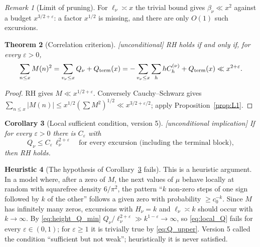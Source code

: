 \documentclass[11pt]{amsart}
\numberwithin{equation}{section}
\theoremstyle{plain}
\newtheorem{theorem}{Theorem}[section]
\newtheorem{corollary}[theorem]{Corollary}
\theoremstyle{definition}
\newtheorem{heuristic}[theorem]{Heuristic}
\theoremstyle{remark}
\newtheorem{remark}[theorem]{Remark}
\newcommand{\eps}{\varepsilon}
\begin{document}
\begin{remark}[Limit of pruning]
\label{rem:pruning_limit}
For $\ell_\nu\asymp x$ the trivial bound gives $\beta_\nu\ll x^2$ against a
budget $x^{3/2+\eps}$: a factor $x^{1/2}$ is missing, and there are only
$O(1)$ such excursions.
\end{remark}

\begin{theorem}[Correlation criterion]
\label{thm:corr-criterion}
\emph{[unconditional]} RH holds if and only if, for every $\eps>0$,
\begin{equation}
\label{eq:RH-corr}
  \sum_{n\le x}M(n)^2=\sum_{v_\nu\le x}Q_\nu+Q_{\rm term}(x)
  =-\sum_{v_\nu\le x}\sum_{h}hC^{(\nu)}_h+Q_{\rm term}(x)\ll x^{2+\eps}.
\end{equation}
\end{theorem}

\begin{proof}
RH gives $M\ll x^{1/2+\eps}$. Conversely Cauchy--Schwarz gives
$\sum_{n\le x}|M(n)|\le x^{1/2}(\sum M^2)^{1/2}\ll x^{3/2+\eps/2}$; apply
Proposition~\ref{prop:L1}.
\end{proof}

\begin{corollary}[Local sufficient condition, version 5]
\label{cor:local-corr-sufficient}
\emph{[unconditional implication]} If for every $\eps>0$ there is
$C_\eps$ with
\begin{equation}
\label{eq:local_Q}
  Q_\nu\le C_\eps\,\ell_\nu^{2+\eps}\quad\text{for every excursion
  (including the terminal block)},
\end{equation}
then RH holds.
\end{corollary}

\begin{heuristic}[The hypothesis of Corollary~\ref{cor:local-corr-sufficient} fails]
\label{heu:local_fails}
This is a heuristic argument. In a model where, after a zero of $M$, the next
values of $\mu$ behave locally at random with squarefree density $6/\pi^2$,
the pattern ``$k$ non-zero steps of one sign followed by $k$ of the other''
follows a given zero with probability $\ge c_0^{-k}$. Since $M$ has
infinitely many zeros, excursions with $H_\nu=k$ and $\ell_\nu\asymp k$
should occur with $k\to\infty$. By \eqref{eq:height_Q_min}
$Q_\nu/\ell_\nu^{2+\eps}\gg k^{1-\eps}\to\infty$, so \eqref{eq:local_Q}
fails for every $\eps\in(0,1)$; for $\eps\ge1$ it is trivially true by
\eqref{eq:Q_upper}. Version 5 called the condition ``sufficient but not
weak''; heuristically it is never satisfied.
\end{heuristic}
\end{document}
